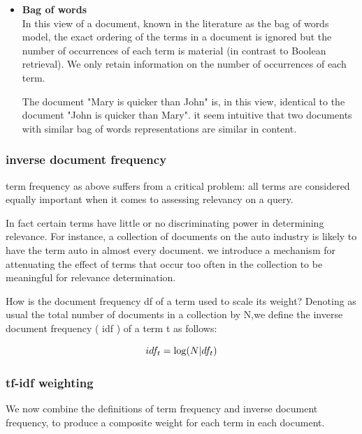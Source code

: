        

\begin{itemize}
     \item \textbf{Bag of words}\\
     In this view of a document, known in the literature as the bag
     of words model, the exact ordering of the terms in a document is ignored but
     the number of occurrences of each term is material (in contrast to Boolean
     retrieval). 
     We only retain information on the number of occurrences of each term. 
    
     The document "Mary is quicker than John" is, in this view, identical to the document "John is quicker than Mary". it seem intuitive that two documents with similar bag of words representations are
     similar in content.
\end{itemize} 

\subsubsection{inverse document frequency}

term frequency as above suffers from a critical problem: all terms are
considered equally important when it comes to assessing relevancy on a
query. 

In fact certain terms have little or no discriminating power in determining relevance. 
For instance, a collection of documents on the auto industry is likely to have the term auto in almost every document.
we introduce a mechanism for attenuating the effect of terms that occur too often in the collection to be meaningful for relevance determination.


How is the document frequency df of a term used to scale its weight? 
Denoting as usual the total number of documents in a collection by N,we define the inverse document frequency ( idf ) of a term t as follows:

\begin{equation}
        \large 
            idf_{t} = \log (N | df_{t})\end{equation}

\subsubsection{tf-idf weighting}

We now combine the definitions of term frequency and inverse document
frequency, to produce a composite weight for each term in each document.

